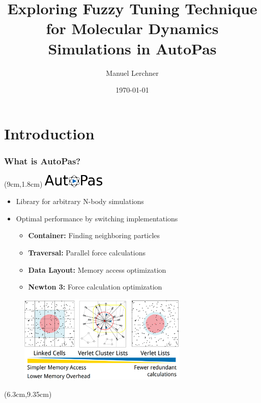 \documentclass[
	10pt,
	t		%
]{beamer}
\title{Exploring Fuzzy Tuning Technique for Molecular Dynamics Simulations in AutoPas}
\author{Manuel Lerchner}
\date{\today}
\begin{document}
\maketitle

\setcounter{framenumber}{0}

\section{Introduction}
\begin{frame}
	\frametitle{What is AutoPas?}

	\begin{textblock*}{5cm}(9cm,1.8cm)
		\includegraphics[width=3cm]{figures/AutoPasLogo}
	\end{textblock*}

	\begin{itemize}
		\item Library for arbitrary N-body simulations
		\item Optimal performance by switching implementations
		      \begin{itemize}
			      \item \textbf{Container:} Finding neighboring particles
			      \item \textbf{Traversal:} Parallel force calculations
			      \item \textbf{Data Layout:} Memory access optimization
			      \item \textbf{Newton 3:} Force calculation optimization
		      \end{itemize}
	\end{itemize}

	\vspace{-0.1cm}
	\begin{figure}
		\centering
		\includegraphics[width=0.72\textwidth]{figures/traversals.png}
	\end{figure}

	\begin{textblock*}{5cm}(6.3cm,9.35cm)
		\tiny{\cite{SIAM_PP24}}
	\end{textblock*}

\end{frame}
\end{document}
